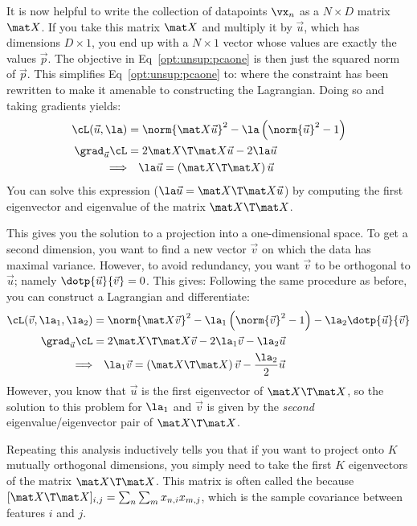 It is now helpful to write the collection of datapoints $\vx_n$ as a
$N \times D$ matrix $\mat X$.  If you take this matrix $\mat X$ and
multiply it by $\vec u$, which has dimensions $D \times 1$, you end up
with a $N \times 1$ vector whose values are exactly the values $\vec
p$.  The objective in Eq~\eqref{opt:unsup:pcaone} is then just the
squared norm of $\vec p$.  This simplifies
Eq~\eqref{opt:unsup:pcaone} to:
%
%
where the constraint has been rewritten to make it amenable to
constructing the Lagrangian.  Doing so and taking gradients yields:
%
\begin{align}
\cL(\vec u, \la) &=
  \norm{ \mat X \vec u }^2
  - \la \left( \norm{\vec u}^2 - 1 \right) \\
\grad_{\vec u} \cL &=
  2 \mat X\T\mat X \vec u  - 2 \la \vec u \\
\Longrightarrow & \quad\la \vec u =  \left(\mat X\T\mat X\right)\vec u
\end{align}
%
You can solve this expression ($\la \vec u =  \mat X\T\mat X \vec u$)
by computing the first eigenvector and eigenvalue of the matrix $\mat
X\T\mat X$.

This gives you the solution to a projection into a one-dimensional
space.  To get a second dimension, you want to find a new vector $\vec
v$ on which the data has maximal variance.  However, to avoid
redundancy, you want $\vec v$ to be orthogonal to $\vec u$; namely
$\dotp{\vec u}{\vec v} = 0$.  This gives:
%
%
Following the same procedure as before, you can construct a Lagrangian
and differentiate:
%
\begin{align}
\cL(\vec v, \la_1, \la_2) &=
\norm{ \mat X \vec v }^2
  - \la_1 \left( \norm{\vec v}^2 - 1 \right)
  - \la_2 \dotp{\vec u}{\vec v}\\
\grad_{\vec u} \cL &=
  2 \mat X\T\mat X \vec v  - 2 \la_1 \vec v - \la_2 \vec u\\
\Longrightarrow & \quad\la_1 \vec v =  \left(\mat X\T\mat X\right)\vec v
- \frac {\la_2} 2 \vec u
\end{align}
%
However, you know that $\vec u$ is the first eigenvector of $\mat
X\T\mat X$, so the solution to this problem for $\la_1$ and $\vec v$
is given by the \emph{second} eigenvalue/eigenvector pair of $\mat
X\T\mat X$.

Repeating this analysis inductively tells you that if you want to
project onto $K$ mutually orthogonal dimensions, you simply need to
take the first $K$ eigenvectors of the matrix $\mat X\T\mat X$.  This
matrix is often called the  because
$[\mat X\T\mat X]_{i,j} = \sum_n \sum_m x_{n,i} x_{m,j}$, which is the
sample covariance between features $i$ and $j$.

